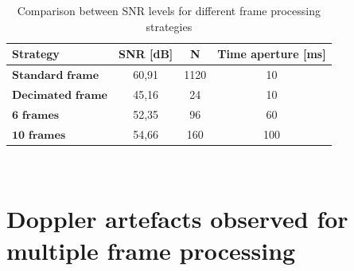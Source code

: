     
\begin{table}[H]
    \centering 
    \begin{tabular}{|p{9em} c c c |}
    \hline
    \rowcolor{bluepoli!40} %
     \textbf{Strategy} & \textbf{SNR [dB]} & \textbf{N} & \textbf{Time aperture [ms]} \T\B \\
    \hline \hline
    $\textbf{Standard frame}$ & 60,91 & 1120 & 10 \T\B \\
    $\textbf{Decimated frame}$ & 45,16 & 24 & 10 \T\B\\
    $\textbf{6 frames}$ & 52,35 & 96 & 60  \T\B\\
    $\textbf{10 frames}$ & 54,66 & 160 & 100  \T\B\\

    \hline
    \end{tabular}
    \\[10pt]
    \caption{Comparison between SNR levels for different frame processing strategies}
    \label{table:TDDstratcomparison}
\end{table}


\section{Doppler artefacts observed for multiple frame processing}
